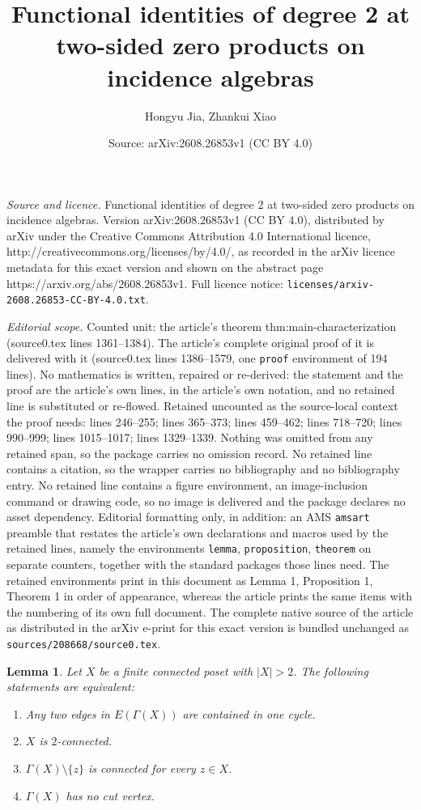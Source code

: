\documentclass[10pt,a4paper]{amsart}
\title{Functional identities of degree 2 at two-sided zero products on incidence algebras}
\author{Hongyu Jia, Zhankui Xiao}
\date{Source: arXiv:2608.26853v1 (CC BY 4.0)}
\newtheorem{lemma}{Lemma}
\begin{document}
\maketitle

\noindent\emph{Source and licence.} Functional identities of degree 2 at two-sided zero products on incidence algebras. Version arXiv:2608.26853v1 (CC BY 4.0), distributed by arXiv under the Creative Commons Attribution 4.0 International licence, http://creativecommons.org/licenses/by/4.0/, as recorded in the arXiv licence metadata for this exact version and shown on the abstract page https://arxiv.org/abs/2608.26853v1. Full licence notice: \texttt{licenses/arxiv-2608.26853-CC-BY-4.0.txt}.\par\smallskip

\noindent\textit{Editorial scope.} Counted unit: the article's theorem thm:main-characterization (source0.tex lines 1361--1384). The article's complete original proof of it is delivered with it (source0.tex lines 1386--1579, one \texttt{proof} environment of 194 lines). No mathematics is written, repaired or re-derived: the statement and the proof are the article's own lines, in the article's own notation, and no retained line is substituted or re-flowed.  Retained uncounted as the source-local context the proof needs: lines 246--255; lines 365--373; lines 459--462; lines 718--720; lines 990--999; lines 1015--1017; lines 1329--1339.  Nothing was omitted from any retained span, so the package carries no omission record.  No retained line contains a citation, so the wrapper carries no bibliography and no bibliography entry.  No retained line contains a figure environment, an image-inclusion command or drawing code, so no image is delivered and the package declares no asset dependency.  Editorial formatting only, in addition: an AMS \texttt{amsart} preamble that restates the article's own declarations and macros used by the retained lines, namely the environments \texttt{lemma}, \texttt{proposition}, \texttt{theorem} on separate counters, together with the standard packages those lines need.  The retained environments print in this document as Lemma 1, Proposition 1, Theorem 1 in order of appearance, whereas the article prints the same items with the numbering of its own full document.  The complete native source of the article as distributed in the arXiv e-print for this exact version is bundled unchanged as \texttt{sources/208668/source0.tex}.
\begin{lemma}\label{lem:graph-equivalences}
Let $X$ be a finite connected poset with $|X|>2$. The following statements are
equivalent:
\begin{enumerate}
\item[(a)] Any two edges in $E(\Gamma(X))$ are contained in one cycle.
\item[(b)] $X$ is $2$-connected.
\item[(c)] $\Gamma(X)\setminus\{z\}$ is connected for every $z\in X$.
\item[(d)] $\Gamma(X)$ has no cut vertex.
\end{enumerate}
\end{lemma}
\end{document}
